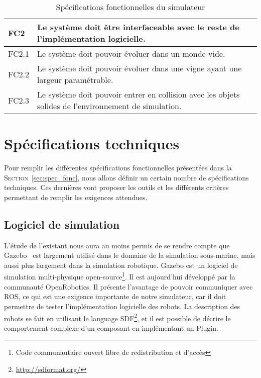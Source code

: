 \begin{table}[!htb]
\begin{adjustbox}{max width=\textwidth}
\begin{tabularx}{\textwidth}{|lX|}
                    \hline \hline
            
                    \cellcolor{orange!40}\textbf{FC2}&\cellcolor{orange!30} Le système doit être interfaceable avec le reste de l'implémentation logicielle. \\
                    \hline
                    \cellcolor{gray!10}FC2.1& Le système doit pouvoir évoluer dans un monde vide. \\
                    \hline
                    \cellcolor{gray!10}FC2.2& Le système doit pouvoir évoluer dans une vigne ayant une largeur paramétrable. \\
                    \hline
                    \cellcolor{gray!10}FC2.3& Le système doit pouvoir entrer en collision avec les objets solides de l'environnement de simulation. \\
                    \hline
                \end{tabularx}
            \end{adjustbox}
            \caption{Spécifications fonctionnelles du simulateur}
            \label{table:specs}
        \end{table}    

    \section{Spécifications techniques}

        Pour remplir les différentes spécifications fonctionnelles présentées dans la \textsc{Section}~\ref{sec:spec_fonc}, nous allons définir un certain nombre de spécifications techniques. Ces dernières vont proposer les outils et les différents critères permettant de remplir les exigences attendues.

        \subsection{Logiciel de simulation}

            L'étude de l'existant nous aura au moins permis de se rendre compte que \gls{Gazebo}~\cite{Koenig-gazebo} est largement utilisé dans le domaine de la simulation sous-marine, mais aussi plus largement dans la simulation robotique. \gls{Gazebo} est un logiciel de simulation multi-physique open-source\footnote{Code communautaire ouvert libre de redistribution et d'accès}. Il est aujourd'hui développé par la communauté \gls{OpenRobotics}. Il présente l'avantage de pouvoir communiquer avec \gls{ROS}, ce qui est une exigence importante de notre simulateur, car il doit permettre de tester l'implémentation logicielle des robots. La description des robots se fait en utilisant le language \gls{SDF}\footnote{\url{http://sdformat.org/}}, et il est possible de décrire le comportement complexe d'un composant en implémentant un \gls{Plugin}.

